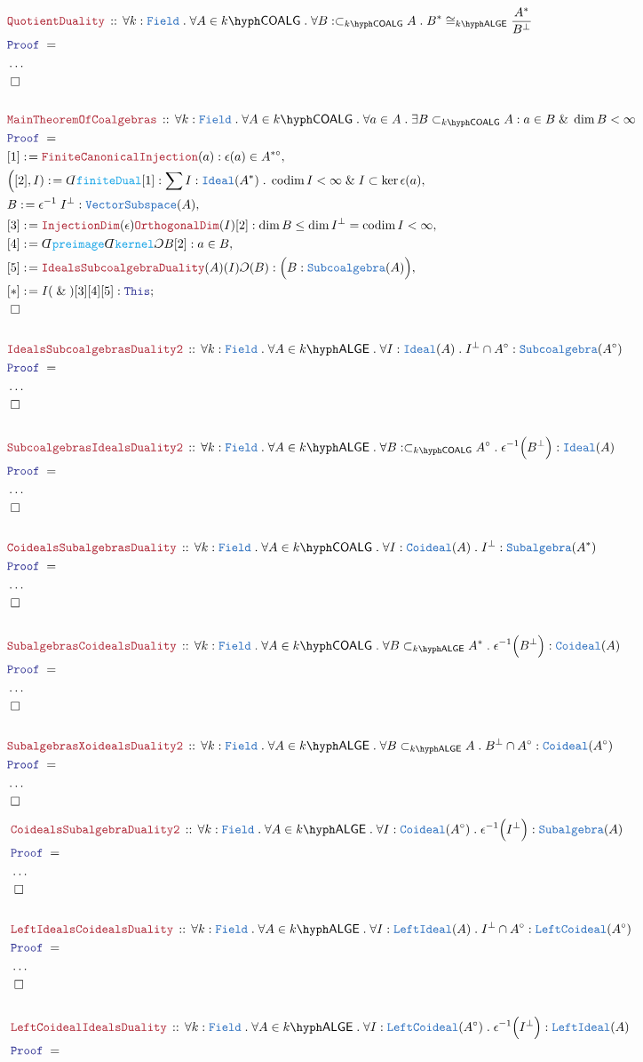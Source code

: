 \documentclass[12pt]{scrartcl}%
\newcommand{\TYPE}[1]{\textcolor{NavyBlue}{\mathtt{#1}}}%
\newcommand{\FUNC}[1]{\textcolor{Cerulean}{\mathtt{#1}}}%
\newcommand{\LOGIC}[1]{\textcolor{Blue}{\mathtt{#1}}}%
\newcommand{\THM}[1]{\textcolor{Maroon}{\mathtt{#1}}}%
\renewcommand{\.}{\; . \;} %
\newcommand{\de}{: \kern 0.1pc =} %
\newcommand{\Theorem}[2]{& \THM{#1} \, :: \, #2 \\ & \Proof = \\ } %
\newcommand{\Page}[1]{ \begin{align*} #1 \end{align*}  }%
\newcommand{ \bd }{ \ByDef }%
\newcommand{\NoProof}{ & \ldots \\ \EndProof}%
\renewcommand{\And}{\; \& \;}%
\newcommand{\Say}[3]{& #1 \de #2 : #3, \\} %
\newcommand{\Conclude}[3]{& #1 \de #2 : #3; \\}%
\newcommand{\QED}{\; \square} %
\newcommand{\EndProof}{& \QED \\} %
\newcommand{\ByDef}{\rotatebox[origin=c]{-180}{$D$}}%
\newcommand{\ByConstr}{\rotatebox[origin=c]{-180}{$C$}}%
\newcommand{\Proof}{\LOGIC{Proof} \; } %
\DeclareMathOperator{\codim}{codim} %
\newcommand{\Field}{\TYPE{Field}}
\newcommand{\Ideal}{\TYPE{Ideal}}
\newcommand{\LALGE}[1]{#1\hyph\mathsf{ALGE}}%
\newcommand{\COALG}[1]{#1\hyph\mathsf{COALG}}%
\begin{document}
\Page{
	\Theorem{QuotientDuality}{\forall k : \Field \. \forall A \in \COALG{k} \. \forall B : \subset_{\COALG{k}} A \. B^* \cong_{\LALGE{k}} \frac{A^*}{B^\bot} }
	\NoProof
	\\
	\Theorem{MainTheoremOfCoalgebras}{ \forall k : \Field \. \forall A \in \COALG{k} \. \forall a \in A \. \exists B \subset_{\COALG{k}} A : a \in B \And \dim B < \infty } 
	\Say{[1]}{\THM{FiniteCanonicalInjection}(a)}{\epsilon(a) \in A^{*\circ}}
	\Say{\Big([2],I)}{\bd \FUNC{finiteDual}[1]}{\sum I : \Ideal(A^*) \. \codim I < \infty \And I \subset \ker \epsilon(a)}
	\Say{B}{\epsilon^{-1} \; I^\bot}{\TYPE{VectorSubspace}(A)}
	\Say{[3]}{\THM{InjectionDim}(\epsilon)  \THM{OrthogonalDim}(I)[2]}{\dim B \le \dim I^\bot = \codim I < \infty}
	\Say{[4]}{\bd \FUNC{preimage}\bd \FUNC{kernel}\ByConstr B [2]}{ a \in B }
	\Say{[5]}{\THM{IdealsSubcoalgebraDuality}(A)(I)\ByConstr(B)}{ \Big(B : \TYPE{Subcoalgebra}(A)\Big)  }
	\Conclude{[*]}{I(\And)[3][4][5]}{\LOGIC{This}}
	\EndProof
	\\
	\Theorem{IdealsSubcoalgebrasDuality2}{\forall k : \Field \. \forall A \in \LALGE{k} \. \forall I : \Ideal(A) \. I^\bot \cap A^\circ : \TYPE{Subcoalgebra}(A^\circ) }
	\NoProof
	\\
	\Theorem{SubcoalgebrasIdealsDuality2}{\forall k : \Field \. \forall A \in \LALGE{k} \. \forall B : \subset_{\COALG{k}} A^\circ \. \epsilon^{-1}\Big(B^\bot\Big) : \Ideal(A) }
	\NoProof
	\\
	\Theorem{CoidealsSubalgebrasDuality}{\forall k : \Field \. \forall A \in \COALG{k} \. \forall I : \TYPE{Coideal}(A) \. I^\bot  : \TYPE{Subalgebra}(A^*) }
	\NoProof
	\\
	\Theorem{SubalgebrasCoidealsDuality}{\forall k : \Field \. \forall A \in \COALG{k} \. \forall B  \subset_{\LALGE{k}}  A^*  \. \epsilon^{-1}\Big(B^\bot\Big) : \TYPE{Coideal}(A) }
	\NoProof
	\\
	\Theorem{SubalgebrasXoidealsDuality2}{\forall k : \Field \. \forall A \in \LALGE{k} \. \forall B \subset_{\LALGE{k}} A  \. B^\bot \cap A^\circ : \TYPE{Coideal}(A^\circ) }
	\NoProof
}\Page{
	\Theorem{CoidealsSubalgebraDuality2}{\forall k : \Field \. \forall A \in \LALGE{k} \. \forall I : \TYPE{Coideal}(A^\circ) \. \epsilon^{-1}\Big(I^\bot\Big) : \TYPE{Subalgebra}(A) }
	\NoProof
	\\
	\Theorem{LeftIdealsCoidealsDuality}{\forall k : \Field \. \forall A \in \LALGE{k} \. \forall I : \TYPE{LeftIdeal}(A) \. I^\bot \cap A^\circ : \TYPE{LeftCoideal}(A^\circ) }
	\NoProof
	\\
	\Theorem{LeftCoidealIdealsDuality}{\forall k : \Field \. \forall A \in \LALGE{k} \. \forall I : \TYPE{LeftCoideal}( A^\circ) \. \epsilon^{-1}\Big(I^\bot\Big) : \TYPE{LeftIdeal}(A) }
}
\end{document}
